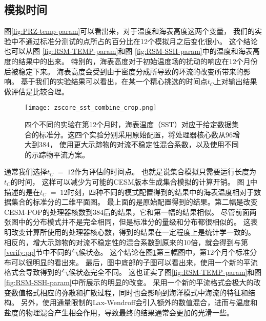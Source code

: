  \subsection{模拟时间}\label{verify:time}
 
图\ref{fig:PRZ-temp-param}可以看出来，对于温度和海表高度这两个变量， 我们的实验中不通过标准分测试的点所占的百分比在12个模拟月之后变化很小。
这个结论也可以从图 \ref{fig:RSM-TEMP-param}和图 \ref{fig:RSM-SSH-param}中的温度和海表高度的结果中的出来。 
特别的，海表高度对于初始温度场的扰动的响应在12个月份后被稳定下来。 
海表高度会受到由于密度分成所导致的环流的改变所带来的影响。
基于我们的实验结果可以看出，在某一个精心挑选的时间点$t_C$上对输出结果做评估是比较合理。 

  
\begin{figure}
\centering
\texttt{[image: zscore\_sst\_combine\_crop.png]}
\caption{四个不同的实验在第12个月时，海表温度（SST）对应于给定数据集合的标准分。这四个实验分别采用原始配置，将处理器核心数从96增大到384， 使用更大示踪物的对流不稳定性混合系数，以及使用不同的示踪物平流方案。}
\label {fig:zscore-combine}
\end{figure}

通常我们选择$t_C \;=\; 12$作为评估的时间点。
也就是说集合模拟只需要运行长度为$t_C$的时间， 这样可以减少为可能的CESM版本生成集合模拟的计算开销。
图 \ref{fig:zscore-combine}中描述的是在$t_C \;=\; 12$时刻，四种不同的模式配置得到的结果中的海表温度相对于数据集合的标准分的二维平面图。
最上面的是原始配置得到的结果。第二幅是改变CESM-POP的处理器核数到384后的结果，它和第一幅的结果相似。
尽管前面两张图中的分布模式并不是完全相同，但是标准分的量级和分布都很相似的。
这表明改变计算所使用的处理器核心数，得到的结果在一定程度上是统计学一致的。
相反的，增大示踪物的对流不稳定性的混合系数到原来的10倍，就会得到与第\ref{verify:pp}节中不同的气候状态。
这个结论在图\ref{fig:zscore-combine}第三幅图中，第12个月个标准分布可以很明显的看出来。 
最后，图中底部的子图可以看出来，使用一个新的平流格式会导致得到的气候状态完全不同。
这也证实了图\ref{fig:RSM-TEMP-param}和图 \ref{fig:RSM-SSH-param}中所展示的明显的改变。 
采用一个新的平流格式会极大的改变数值格式相应的弥散和扩散过程\cite{tseng2008}，同时也会影响到海洋模式中海流的特征和结构\cite{tseng2006}。
另外，使用通量限制的Lax-Wendroff会引入额外的数值混合，进而与温度和盐度的物理混合产生相会作用，导致最终的结果通常会更加的光滑一些。



